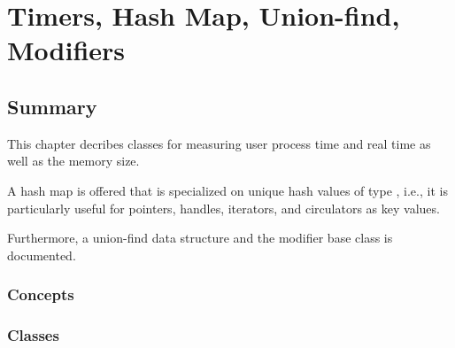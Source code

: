 %
%
\chapter{Timers, Hash Map, Union-find, Modifiers}
\label{chap:union_find}
\label{chap:hash_map}

\section*{Summary}

This chapter decribes classes for measuring user process time and real time
as well as the memory size.

A hash map  is offered that is specialized
on unique hash values of type , i.e., it is
particularly useful for pointers, handles, iterators, and circulators
as key values.

Furthermore, a union-find data structure and the modifier base class
is documented.

\subsection*{Concepts}


\subsection*{Classes}

 \\
 \\

\\



